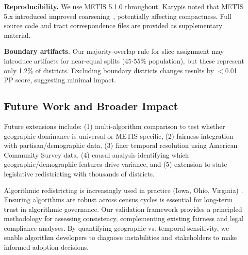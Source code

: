 \textbf{Reproducibility.} We use METIS 5.1.0 throughout. Karypis noted that METIS 5.x introduced improved coarsening~\cite{karypis2013metis5}, potentially affecting compactness. Full source code and tract correspondence files are provided as supplementary material.

\textbf{Boundary artifacts.} Our majority-overlap rule for slice assignment may introduce artifacts for near-equal splits (45-55\% population), but these represent only 1.2\% of districts. Excluding boundary districts changes results by $<$0.01 PP score, suggesting minimal impact.

\subsection{Future Work and Broader Impact}

Future extensions include: (1) multi-algorithm comparison to test whether geographic dominance is universal or METIS-specific, (2) fairness integration with partisan/demographic data, (3) finer temporal resolution using American Community Survey data, (4) causal analysis identifying which geographic/demographic features drive variance, and (5) extension to state legislative redistricting with thousands of districts.

Algorithmic redistricting is increasingly used in practice (Iowa, Ohio, Virginia)~\cite{mcghee2020}. Ensuring algorithms are robust across census cycles is essential for long-term trust in algorithmic governance. Our validation framework provides a principled methodology for assessing consistency, complementing existing fairness and legal compliance analyses. By quantifying geographic vs. temporal sensitivity, we enable algorithm developers to diagnose instabilities and stakeholders to make informed adoption decisions.
